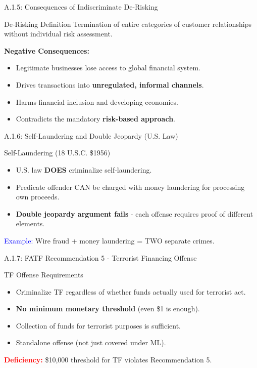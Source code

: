 \documentclass{beamer}
\begin{document}
	\begin{frame}{A.1.5: Consequences of Indiscriminate De-Risking}
		\begin{block}{De-Risking Definition}
			Termination of entire categories of customer relationships without individual risk assessment.
		\end{block}
		\textbf{Negative Consequences:}
		\begin{itemize}
			\item Legitimate businesses lose access to global financial system.
			\item Drives transactions into \textbf{unregulated, informal channels}.
			\item Harms financial inclusion and developing economies.
			\item Contradicts the mandatory \textbf{risk-based approach}.
		\end{itemize}
	\end{frame}
	
	\begin{frame}{A.1.6: Self-Laundering and Double Jeopardy (U.S. Law)}
		\begin{block}{Self-Laundering (18 U.S.C. \$1956)}
			\begin{itemize}
				\item U.S. law \textbf{DOES} criminalize self-laundering.
				\item Predicate offender CAN be charged with money laundering for processing own proceeds.
				\item \textbf{Double jeopardy argument fails} - each offense requires proof of different elements.
			\end{itemize}
		\end{block}
		\textcolor{blue}{Example:} Wire fraud + money laundering = TWO separate crimes.
	\end{frame}
	
	\begin{frame}{A.1.7: FATF Recommendation 5 - Terrorist Financing Offense}
		\begin{block}{TF Offense Requirements}
			\begin{itemize}
				\item Criminalize TF regardless of whether funds actually used for terrorist act.
				\item \textbf{No minimum monetary threshold} (even \$1 is enough).
				\item Collection of funds for terrorist purposes is sufficient.
				\item Standalone offense (not just covered under ML).
			\end{itemize}
		\end{block}
		\textcolor{red}{\textbf{Deficiency:}} \$10,000 threshold for TF violates Recommendation 5.
	\end{frame}
	
\end{document}
